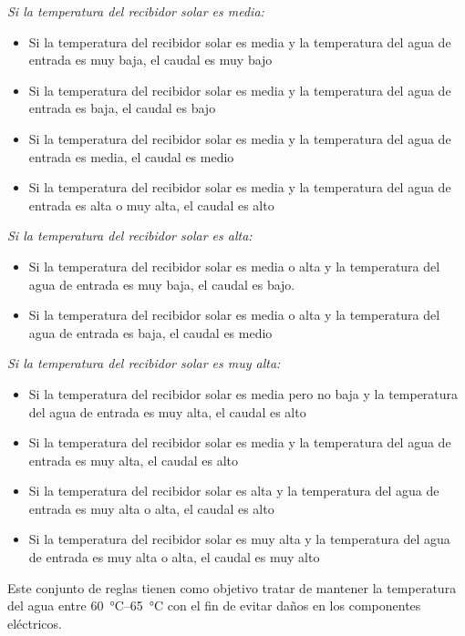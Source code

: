 			\textit{Si la temperatura del recibidor solar es media:}\par
			\begin{itemize}
				\item Si la temperatura del recibidor solar es media y la temperatura del agua de entrada es muy baja, el caudal es muy bajo
				\item Si la temperatura del recibidor solar es media y la temperatura del agua de entrada es baja, el caudal es bajo
				\item Si la temperatura del recibidor solar es media y la temperatura del agua de entrada es media, el caudal es medio
				\item Si la temperatura del recibidor solar es media y la temperatura del agua de entrada es alta o muy alta, el caudal es alto
			\end{itemize}
			
			\textit{Si la temperatura del recibidor solar es alta:}\par
			\begin{itemize}
				\item Si la temperatura del recibidor solar es media o alta y la temperatura del agua de entrada es muy baja, el caudal es bajo.
				\item Si la temperatura del recibidor solar es media o alta y la temperatura del agua de entrada es baja, el caudal es medio
			\end{itemize}
			
			\textit{Si la temperatura del recibidor solar es muy alta:}\par
			\begin{itemize}
				\item Si la temperatura del recibidor solar es media pero no baja y la temperatura del agua de entrada es muy alta, el caudal es alto
				\item Si la temperatura del recibidor solar es media y la temperatura del agua de entrada es muy alta, el caudal es alto
				\item Si la temperatura del recibidor solar es alta y la temperatura del agua de entrada es muy alta o alta, el caudal es alto
				\item Si la temperatura del recibidor solar es muy alta y la temperatura del agua de entrada es muy alta o alta, el caudal es muy alto
			\end{itemize}
			
			Este conjunto de reglas tienen como objetivo tratar de mantener la temperatura del agua entre \qtyrange{60}{65}{\degreeCelsius} con el fin de evitar daños en los componentes eléctricos.
	
